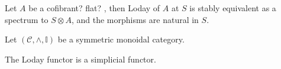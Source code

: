   \begin{cor}\label{cor_loday_at_S_naturally_equivalent_to_tensor_with_S}
    Let $A$ be a cofibrant? flat? \hring, then Loday of $A$ at $S$ is stably
    equivalent as a spectrum to $S \otimes A$, and the morphisms are natural in
    $S$.
  \end{cor}
  \begin{defn}\label{def_loday_functor_in_symmetric_monoidal_category} 
    Let $(\mathcal{C},\wedge, \mathbb{I})$ be a symmetric monoidal category.\\
  \end{defn}
  \begin{lem}\label{lem_loday_functor_is_simplicial}
    The Loday functor is a simplicial functor.\\
  \end{lem}
